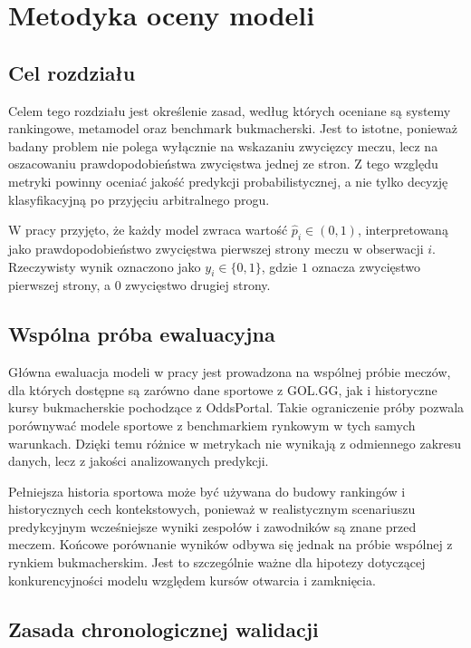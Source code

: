 \chapter{Metodyka oceny modeli}

\section{Cel rozdziału}

Celem tego rozdziału jest określenie zasad, według których oceniane są systemy rankingowe, metamodel oraz benchmark bukmacherski. Jest to istotne, ponieważ badany problem nie polega wyłącznie na wskazaniu zwycięzcy meczu, lecz na oszacowaniu prawdopodobieństwa zwycięstwa jednej ze stron. Z tego względu metryki powinny oceniać jakość predykcji probabilistycznej, a nie tylko decyzję klasyfikacyjną po przyjęciu arbitralnego progu.

W pracy przyjęto, że każdy model zwraca wartość \(\hat{p}_i \in (0,1)\), interpretowaną jako prawdopodobieństwo zwycięstwa pierwszej strony meczu w obserwacji \(i\). Rzeczywisty wynik oznaczono jako \(y_i \in \{0,1\}\), gdzie \(1\) oznacza zwycięstwo pierwszej strony, a \(0\) zwycięstwo drugiej strony.

\section{Wspólna próba ewaluacyjna}

Główna ewaluacja modeli w pracy jest prowadzona na wspólnej próbie meczów, dla których dostępne są zarówno dane sportowe z GOL.GG, jak i historyczne kursy bukmacherskie pochodzące z OddsPortal. Takie ograniczenie próby pozwala porównywać modele sportowe z benchmarkiem rynkowym w tych samych warunkach. Dzięki temu różnice w metrykach nie wynikają z odmiennego zakresu danych, lecz z jakości analizowanych predykcji.

Pełniejsza historia sportowa może być używana do budowy rankingów i historycznych cech kontekstowych, ponieważ w realistycznym scenariuszu predykcyjnym wcześniejsze wyniki zespołów i zawodników są znane przed meczem. Końcowe porównanie wyników odbywa się jednak na próbie wspólnej z rynkiem bukmacherskim. Jest to szczególnie ważne dla hipotezy dotyczącej konkurencyjności modelu względem kursów otwarcia i zamknięcia.

\section{Zasada chronologicznej walidacji}

